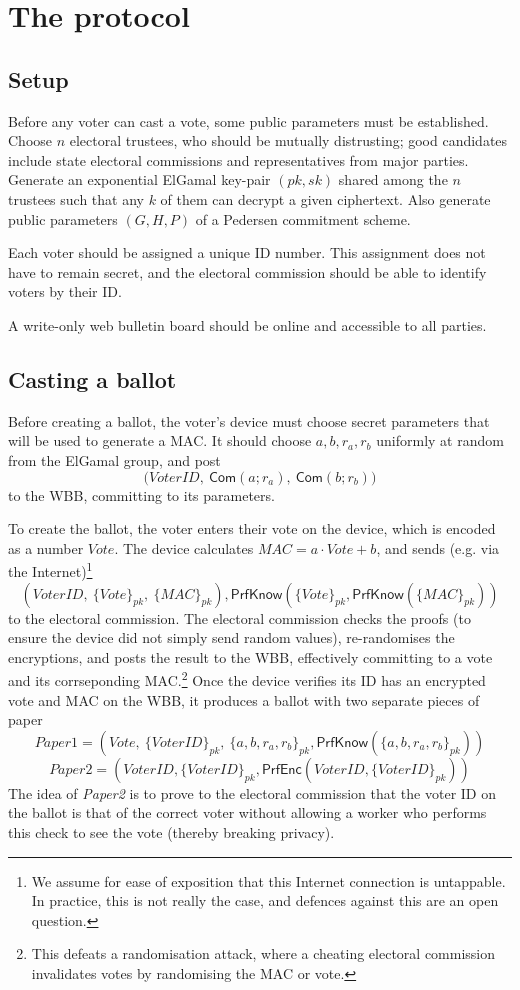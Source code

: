 \documentclass[11pt,twoside,a4paper]{article}
\newcommand{\commit}{\mathsf{Com}}
\newcommand{\PrfEnc}{\mathsf{PrfEnc}}
\newcommand{\PrfKnow}{\mathsf{PrfKnow}}
\theoremstyle{definition}
\begin{document}
\section{The protocol}\label{sec-protocol}
\subsection{Setup}
Before any voter can cast a vote, some public parameters must be established. Choose \(n\) electoral trustees, who should be mutually distrusting; good candidates include state electoral commissions and representatives from major parties. Generate an exponential ElGamal key-pair \((pk, sk)\) shared among the \(n\) trustees such that any \(k\) of them can decrypt a given ciphertext. Also generate public parameters \((G, H, P)\) of a Pedersen commitment scheme.

Each voter should be assigned a unique ID number. This assignment does not have to remain secret, and the electoral commission should be able to identify voters by their ID.

A write-only web bulletin board should be online and accessible to all parties.
\subsection{Casting a ballot}
Before creating a ballot, the voter's device must choose secret parameters that will be used to generate a MAC. It should choose \(a,b,r_a,r_b\) uniformly at random from the ElGamal group, and post
\[\big(VoterID,\ \commit(a;r_a),\ \commit(b;r_b)\big)\]
to the WBB, committing to its parameters.

To create the ballot, the voter enters their vote on the device, which is encoded as a number \(Vote\). The device calculates \(MAC=a\cdot Vote+b\), and sends (e.g. via the Internet)\footnote{We assume for ease of exposition that this Internet connection is untappable. In practice, this is not really the case, and defences against this are an open question.}
\[\left(VoterID,\ \{Vote\}_{pk},\ \{MAC\}_{pk}\right), \PrfKnow(\{Vote\}_{pk}, \PrfKnow(\{MAC\}_{pk}))\]
to the electoral commission. The electoral commission checks the proofs (to ensure the device did not simply send random values), re-randomises the encryptions, and posts the result to the WBB, effectively committing to a vote and its corrseponding MAC.\footnote{This defeats a randomisation attack, where a cheating electoral commission invalidates votes by randomising the MAC or vote.} Once the device verifies its ID has an encrypted vote and MAC on the WBB, it produces a ballot with two separate pieces of paper
\[\textit{Paper1} = \left(Vote,\ \{VoterID\}_{pk},\ \{a,b,r_a,r_b\}_{pk}, \PrfKnow(\{a,b,r_a,r_b\}_{pk})\right)\]
\[\textit{Paper2} = \left(VoterID, \{VoterID\}_{pk}, \PrfEnc(VoterID, \{VoterID\}_{pk})\right)\]
The idea of \textit{Paper2} is to prove to the electoral commission that the voter ID on the ballot is that of the correct voter without allowing a worker who performs this check to see the vote (thereby breaking privacy).
\end{document}
